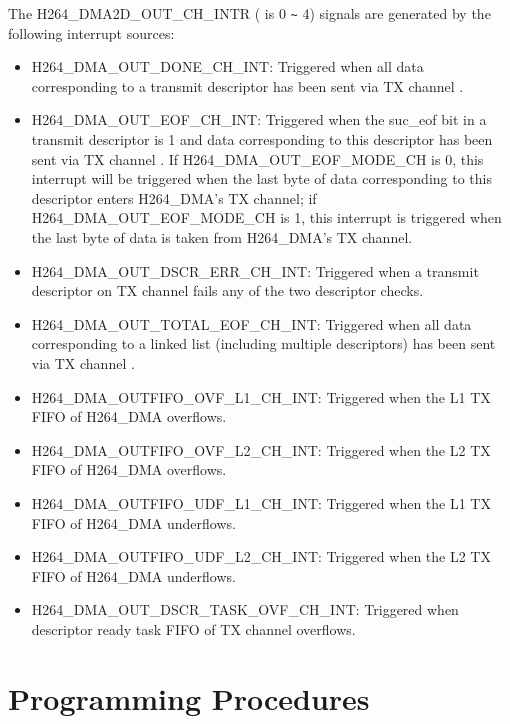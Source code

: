 \documentclass[main\_\_EN.tex]{subfiles}
\begin{document}
The H264\_DMA2D\_OUT\_CH\_INTR ( is 0 \verb+~+ 4) signals are generated by the following interrupt sources:

\begin{itemize}
\item H264\_DMA\_OUT\_DONE\_CH\_INT: Triggered when all data corresponding to a transmit descriptor has been sent via TX channel .
\item H264\_DMA\_OUT\_EOF\_CH\_INT: Triggered when the suc\_eof bit in a transmit descriptor is 1 and data corresponding to this descriptor has been sent via TX channel . If H264\_DMA\_OUT\_EOF\_MODE\_CH is 0, this interrupt will be triggered when the last byte of data corresponding to this descriptor enters H264\_DMA's TX channel; if H264\_DMA\_OUT\_EOF\_MODE\_CH is 1, this interrupt is triggered when the last byte of data is taken from H264\_DMA's TX channel.
\item H264\_DMA\_OUT\_DSCR\_ERR\_CH\_INT: Triggered when a transmit descriptor on TX channel  fails any of the two descriptor checks.
\item H264\_DMA\_OUT\_TOTAL\_EOF\_CH\_INT: Triggered when all data corresponding to a linked list (including multiple descriptors) has been sent via TX channel .
\item H264\_DMA\_OUTFIFO\_OVF\_L1\_CH\_INT: Triggered when the L1 TX FIFO of H264\_DMA overflows.
\item H264\_DMA\_OUTFIFO\_OVF\_L2\_CH\_INT: Triggered when the L2 TX FIFO of H264\_DMA overflows.
\item H264\_DMA\_OUTFIFO\_UDF\_L1\_CH\_INT: Triggered when the L1 TX FIFO of H264\_DMA underflows.
\item H264\_DMA\_OUTFIFO\_UDF\_L2\_CH\_INT: Triggered when the L2 TX FIFO of H264\_DMA underflows.
\item H264\_DMA\_OUT\_DSCR\_TASK\_OVF\_CH\_INT: Triggered when descriptor ready task FIFO of TX channel  overflows.
\end{itemize}


\section{Programming Procedures}
\label{sec:h264enc-prog-procedures}
\end{document}
